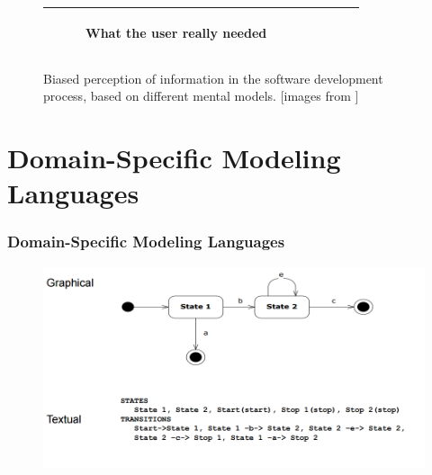 \documentclass[11 pt,t]{beamer}
\begin{document}
\begin{frame}
\begin{figure}[h]
\begin{center}
\begin{tabular}{|c|c|c|c|c|}
\begin{subfigure}[t]{0.15\textwidth}
\caption*{\tiny \centering What the user really needed}\label{fig:whatneeded}\end{subfigure}\\
\hline
\end{tabular}
\caption{Biased perception of information in the software development process, based on different mental models. [images from \cite{projectcartoon}]}
\label{fig:swingexample}
\end{center}
\end{figure}
\end{frame}

\section{Domain-Specific Modeling Languages}

\begin{frame}
\vspace{.5cm}
  \frametitle{Domain-Specific Modeling Languages}
    \begin{figure}[H]
      \centering
      \includegraphics[width=\textwidth]{../images/GraficalTextualComparison.PNG}
      \label{compare:textgraphiclang}
    \end{figure}
\end{frame}
\end{document}
